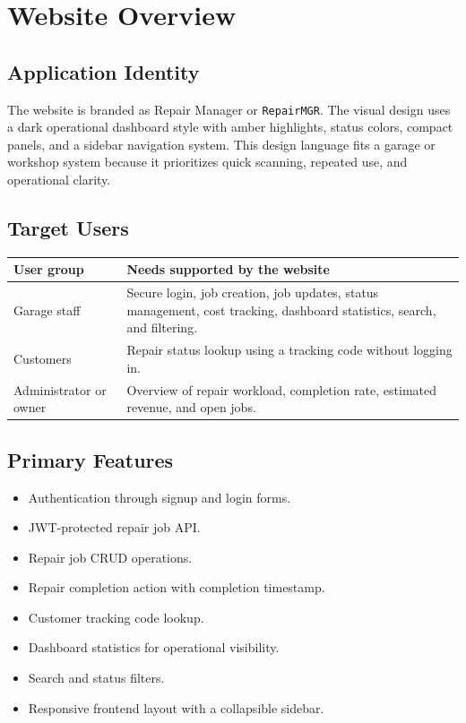 \documentclass[12pt,a4paper]{report}
\newcommand{\projectname}{Repair Manager}
\begin{document}
\chapter{Website Overview}

\section{Application Identity}

The website is branded as \projectname{} or \texttt{RepairMGR}. The visual design uses a dark operational dashboard style with amber highlights, status colors, compact panels, and a sidebar navigation system. This design language fits a garage or workshop system because it prioritizes quick scanning, repeated use, and operational clarity.

\section{Target Users}

\begin{longtable}{p{}p{}}
\toprule
\textbf{User group} & \textbf{Needs supported by the website}\\
\midrule
Garage staff & Secure login, job creation, job updates, status management, cost tracking, dashboard statistics, search, and filtering.\\
Customers & Repair status lookup using a tracking code without logging in.\\
Administrator or owner & Overview of repair workload, completion rate, estimated revenue, and open jobs.\\
\bottomrule
\end{longtable}

\section{Primary Features}

\begin{itemize}
  \item Authentication through signup and login forms.
  \item JWT-protected repair job API.
  \item Repair job CRUD operations.
  \item Repair completion action with completion timestamp.
  \item Customer tracking code lookup.
  \item Dashboard statistics for operational visibility.
  \item Search and status filters.
  \item Responsive frontend layout with a collapsible sidebar.
\end{itemize}
\end{document}
